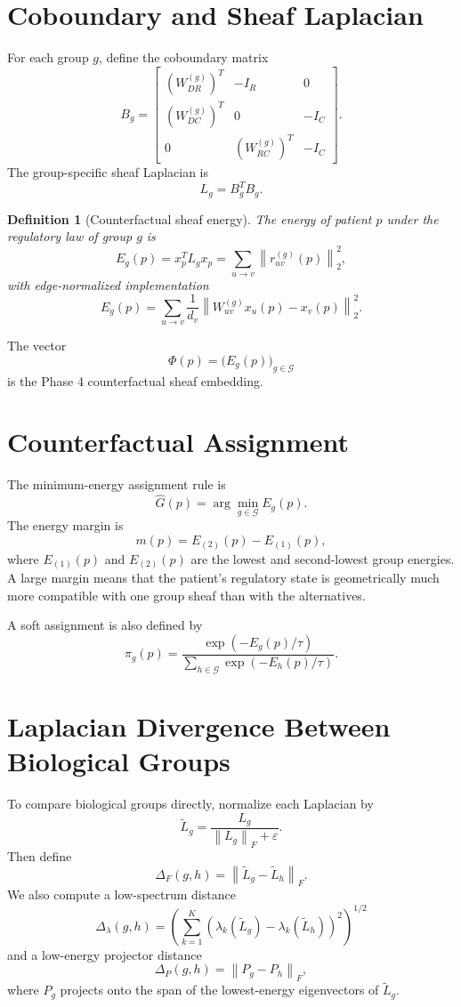 \documentclass[11pt]{article}
\newtheorem{definition}{Definition}
\newcommand{\norm}[1]{\left\lVert #1 \right\rVert}
\begin{document}
\section{Coboundary and Sheaf Laplacian}
For each group $g$, define the coboundary matrix
\[
B_g=
\begin{bmatrix}
\left(W_{DR}^{(g)}\right)^T & -I_R & 0\\
\left(W_{DC}^{(g)}\right)^T & 0 & -I_C\\
0 & \left(W_{RC}^{(g)}\right)^T & -I_C
\end{bmatrix}.
\]
The group-specific sheaf Laplacian is
\[
  L_g=B_g^T B_g.
\]

\begin{definition}[Counterfactual sheaf energy]
The energy of patient $p$ under the regulatory law of group $g$ is
\[
  E_g(p)
  =x_p^T L_gx_p
  =\sum_{u\to v}\norm{r_{uv}^{(g)}(p)}_2^2,
\]
with edge-normalized implementation
\[
  E_g(p)=
  \sum_{u\to v}\frac{1}{d_v}
  \norm{W_{uv}^{(g)}x_u(p)-x_v(p)}_2^2.
\]
\end{definition}

The vector
\[
  \Phi(p)=\big(E_g(p)\big)_{g\in\mathcal{G}}
\]
is the Phase 4 counterfactual sheaf embedding.

\section{Counterfactual Assignment}
The minimum-energy assignment rule is
\[
  \widehat{G}(p)=\arg\min_{g\in\mathcal{G}} E_g(p).
\]
The energy margin is
\[
  m(p)=E_{(2)}(p)-E_{(1)}(p),
\]
where $E_{(1)}(p)$ and $E_{(2)}(p)$ are the lowest and second-lowest group energies. A large margin means that the patient's regulatory state is geometrically much more compatible with one group sheaf than with the alternatives.

A soft assignment is also defined by
\[
  \pi_g(p)=
  \frac{\exp(-E_g(p)/\tau)}
  {\sum_{h\in\mathcal{G}}\exp(-E_h(p)/\tau)}.
\]

\section{Laplacian Divergence Between Biological Groups}
To compare biological groups directly, normalize each Laplacian by
\[
  \widetilde L_g=\frac{L_g}{\norm{L_g}_F+\varepsilon}.
\]
Then define
\[
  \Delta_F(g,h)=\norm{\widetilde L_g-\widetilde L_h}_F.
\]
We also compute a low-spectrum distance
\[
  \Delta_{\lambda}(g,h)=
  \left(\sum_{k=1}^{K}(\lambda_k(\widetilde L_g)-\lambda_k(\widetilde L_h))^2\right)^{1/2}
\]
and a low-energy projector distance
\[
  \Delta_P(g,h)=\norm{P_g-P_h}_F,
\]
where $P_g$ projects onto the span of the lowest-energy eigenvectors of $\widetilde L_g$.
\end{document}
